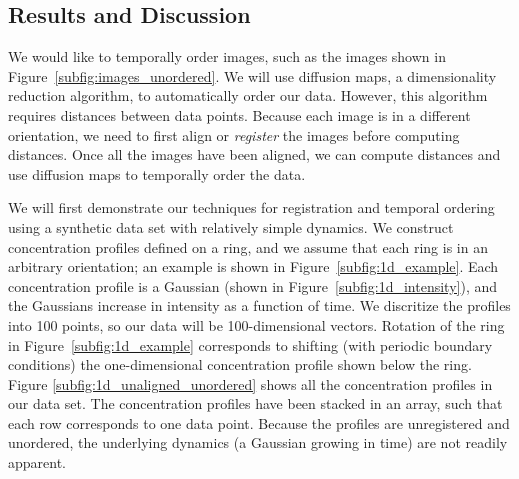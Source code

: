 \documentclass{pnastwo}
\begin{document}
\begin{article}
\section{Results and Discussion}

We would like to temporally order images, such as the images shown in Figure~\ref{subfig:images_unordered}.
%
We will use diffusion maps, a dimensionality reduction algorithm, to automatically order our data.
%
However, this algorithm requires distances between data points. 
%
Because each image is in a different orientation, we need to first align or {\em register} the images before computing distances.
%
Once all the images have been aligned, we can compute distances and use diffusion maps to temporally order the data.

We will first demonstrate our techniques for registration and temporal ordering using a synthetic data set with relatively simple dynamics.
%
We construct concentration profiles defined on a ring, and we assume that each ring is in an arbitrary orientation; an example is shown in Figure~\ref{subfig:1d_example}.
%
Each concentration profile is a Gaussian (shown in Figure~\ref{subfig:1d_intensity}), and the Gaussians increase in intensity as  a function of time.
%
We discritize the profiles into 100 points, so our data will be 100-dimensional vectors. 
%
Rotation of the ring in Figure~\ref{subfig:1d_example} corresponds to shifting (with periodic boundary conditions) the one-dimensional concentration profile shown below the ring. 
%
Figure \ref{subfig:1d_unaligned_unordered} shows all the concentration profiles in our data set. 
%
The concentration profiles have been stacked in an array, such that each row corresponds to one data point.
%
Because the profiles are unregistered and unordered, the underlying dynamics (a Gaussian growing in time) are not readily apparent.


\end{article}
\end{document}

